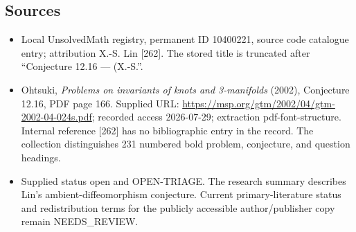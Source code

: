 \documentclass[11pt]{article}
\begin{document}
\subsection{Sources}
\begin{itemize}
\item Local UnsolvedMath registry, permanent ID 10400221, source code catalogue entry; attribution X.-S. Lin [262]. The stored title is truncated after ``Conjecture 12.16 --- (X.-S.''.
\item Ohtsuki, \emph{Problems on invariants of knots and 3-manifolds} (2002), Conjecture 12.16, PDF page 166. Supplied URL: \url{https://msp.org/gtm/2002/04/gtm-2002-04-024s.pdf}; recorded access 2026-07-29; extraction pdf-font-structure. Internal reference [262] has no bibliographic entry in the record. The collection distinguishes 231 numbered bold problem, conjecture, and question headings.
\item Supplied status open and OPEN-TRIAGE. The research summary describes Lin's ambient-diffeomorphism conjecture. Current primary-literature status and redistribution terms for the publicly accessible author/publisher copy remain NEEDS\_REVIEW.
\end{itemize}
\end{document}
